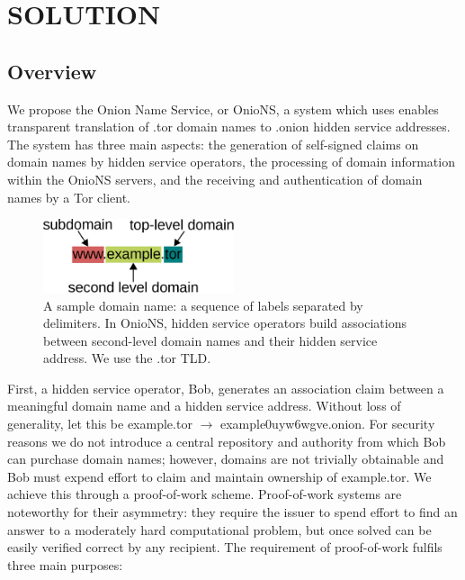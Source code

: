 
\chapter{SOLUTION}



\section{Overview}

We propose the Onion Name Service, or OnioNS, a system which uses enables transparent translation of .tor domain names to .onion hidden service addresses. The system has three main aspects: the generation of self-signed claims on domain names by hidden service operators, the processing of domain information within the OnioNS servers, and the receiving and authentication of domain names by a Tor client.

\begin{figure}[htbp]
	\centering
	\includegraphics[width=0.5\textwidth]{images/domain-name.eps}
	\caption{A sample domain name: a sequence of labels separated by delimiters. In OnioNS, hidden service operators build associations between second-level domain names and their hidden service address. We use the .tor TLD.}
\end{figure}

First, a hidden service operator, Bob, generates an association claim between a meaningful domain name and a hidden service address. Without loss of generality, let this be example.tor $ \rightarrow $ example0uyw6wgve.onion. For security reasons we do not introduce a central repository and authority from which Bob can purchase domain names; however, domains are not trivially obtainable and Bob must expend effort to claim and maintain ownership of example.tor. We achieve this through a proof-of-work scheme. Proof-of-work systems are noteworthy for their asymmetry: they require the issuer to spend effort to find an answer to a moderately hard computational problem, but once solved can be easily verified correct by any recipient. The requirement of proof-of-work fulfils three main purposes:

